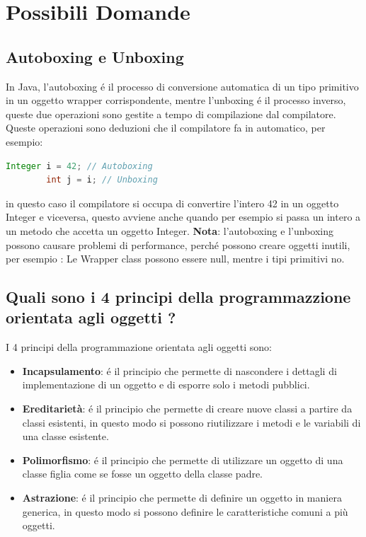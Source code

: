 \documentclass[11pt]{article}
\begin{document}
\section {Possibili Domande}
\subsection{Autoboxing e Unboxing}
    In Java, l'autoboxing é il processo di conversione automatica di un tipo primitivo in un oggetto wrapper corrispondente, mentre l'unboxing é il processo inverso,
    queste due operazioni sono gestite a tempo di compilazione dal compilatore.
    Queste operazioni sono deduzioni che il compilatore fa in automatico, per esempio:
    \begin{lstlisting}[language=Java]
        Integer i = 42; // Autoboxing
        int j = i; // Unboxing
    \end{lstlisting}
    in questo caso il compilatore si occupa di convertire l'intero 42 in un oggetto Integer e viceversa, questo avviene anche quando per esempio si passa un intero a un metodo che accetta un oggetto Integer.
    \textbf{Nota}: l'autoboxing e l'unboxing possono causare problemi di performance, perché possono creare oggetti inutili, per esempio
    : Le Wrapper class possono essere null, mentre i tipi primitivi no.
\subsection{Quali sono i 4 principi della programmazzione orientata agli oggetti ?}
    I 4 principi della programmazione orientata agli oggetti sono:
    \begin{itemize}
        \item \textbf{Incapsulamento}: é il principio che permette di nascondere i dettagli di implementazione di un oggetto e di esporre solo i metodi pubblici.
        \item \textbf{Ereditarietà}: é il principio che permette di creare nuove classi a partire da classi esistenti, in questo modo si possono riutilizzare i metodi e le variabili di una classe esistente.
        \item \textbf{Polimorfismo}: é il principio che permette di utilizzare un oggetto di una classe figlia come se fosse un oggetto della classe padre.
        \item \textbf{Astrazione}: é il principio che permette di definire un oggetto in maniera generica, in questo modo si possono definire le caratteristiche comuni a più oggetti.
        \end{itemize}
\end{document}
